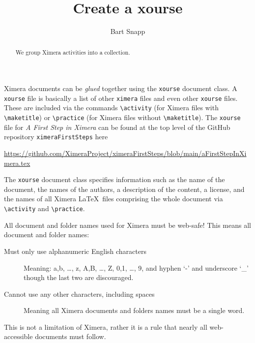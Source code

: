 \documentclass{ximera}
\title{Create a xourse}
\author{Bart Snapp}
\begin{document}
\begin{abstract}
  We group Ximera activities into a collection.
\end{abstract}
\maketitle


Ximera documents can be \textit{glued} together using the \texttt{xourse}
document class. A \verb|xourse| file is basically a list of other \verb|ximera|
files and even
other \verb|xourse| files. These are included via the commands \verb!\activity!
(for Ximera files with \verb!\maketitle!) or \verb!\practice! (for Ximera files
without \verb!\maketitle!). The \verb|xourse| file for \textit{A First Step in
  Ximera} can be found at the top level of the GitHub repository
\verb!ximeraFirstSteps! here
\begin{center}

  \url{https://github.com/XimeraProject/ximeraFirstSteps/blob/main/aFirstStepInXimera.tex}
\end{center}
The \verb!xourse! document class specifies information such as the name of the
document, the names of the authors, a description of the content, a license,
and
the names of all Ximera \LaTeX\ files comprising
the whole document via \verb!\activity! and \verb!\practice!.

\begin{warning}
  All document and folder names used for Ximera must be web-safe! This means
  all document and folder names:
  \begin{description}
    \item[Must only use alphanumeric English characters] Meaning: a,b, \dots,
      z, A,B, \dots, Z, 0,1, \dots, 9, and hyphen `-' and underscore `\_'
      though the
      last two are discouraged.
    \item[Cannot use any other characters, including spaces] Meaning all
      Ximera documents and folders names must be a single word.
  \end{description}
  This is not a limitation of Ximera, rather it is a rule that nearly all
  web-accessible documents must follow.
\end{warning}
\end{document}
